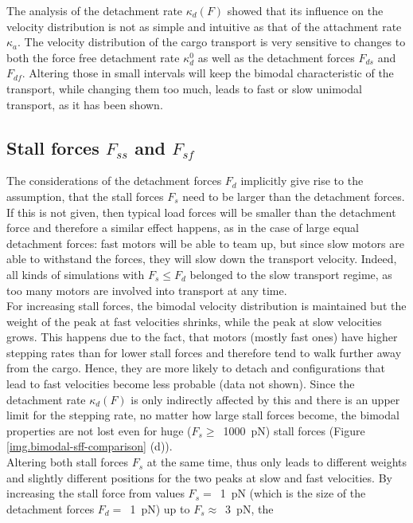 The analysis of the detachment rate $\kappa_d\left(F\right)$ showed that its influence on the velocity distribution is not as simple and intuitive as that of the attachment rate $\kappa_a$. The
velocity distribution of the cargo transport is very sensitive to changes to both the force free detachment rate $\kappa_d^0$ as well as the detachment forces $F_{ds}$ and $F_{df}$. Altering those
in small intervals will keep the bimodal characteristic of the transport, while changing them too much, leads to fast or slow unimodal transport, as it has been shown.


\subsection{Stall forces $F_{ss}$ and $F_{sf}$}\label{ss.stall-forces}
The considerations of the detachment forces $F_{d}$ implicitly give rise to the assumption, that the stall forces $F_{s}$ need to be larger than the detachment forces. If this is not given, then
typical load forces will be smaller than the detachment force and therefore a similar effect happens, as in the case of large equal detachment forces: fast motors will be able to team up, but since
slow motors are able to withstand the forces, they will slow down the transport velocity. Indeed, all kinds of simulations with \mbox{$F_{s} \leq F_{d}$} belonged to the slow transport regime, as
too many motors are involved into transport at any time. \\
For increasing stall forces, the bimodal velocity distribution is maintained but the weight of the peak at fast velocities shrinks, while the peak at slow velocities grows. This happens due to the
fact, that motors (mostly fast ones) have higher stepping rates than for lower stall forces and therefore tend to walk further away from the cargo. Hence, they are more likely to detach and
configurations that lead to fast velocities become less probable (data not shown). Since the detachment rate $\kappa_d\left(F\right)$ is only indirectly affected by this and there is an upper limit for the stepping
rate, no matter how large stall forces become, the bimodal properties are not lost even for huge (\mbox{$F_{s} \geq$ \SI{1000}{\pico\newton}}) stall forces (Figure \ref{img.bimodal-sff-comparison} (d)). \\
Altering both stall forces $F_{s}$ at the same time, thus only leads to different weights and slightly different positions for the two peaks at slow and fast velocities. By increasing the stall
force from values \mbox{$F_{s} =$ \SI{1}{\pico\newton}} (which is the size of the detachment forces \mbox{$F_{d} =$ \SI{1}{\pico\newton}}) up to \mbox{$F_{s} \approx$ \SI{3}{\pico\newton}}, the

